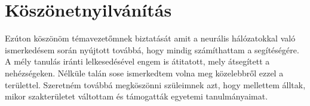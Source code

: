 \chapter*{Köszönetnyilvánítás}
Ezúton köszönöm témavezetőmnek biztatását amit a neurális hálózatokkal való ismerkedésem során nyújtott továbbá, hogy mindig számíthattam a segítéségére. A mély tanulás iránti lelkesedésével engem is átitatott, mely átsegített a nehézségeken. Nélküle talán sose ismerkedtem volna meg közelebbről ezzel a területtel. Szeretném továbbá megköszönni szüleimnek azt, hogy mellettem álltak, mikor szakterületet váltottam és támogatták egyetemi tanulmányaimat.